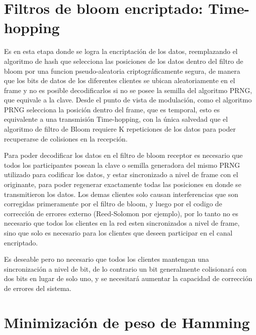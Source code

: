 \section{Filtros de bloom encriptado: Time-hopping}

Es en esta etapa donde se logra la encriptación de los datos, reemplazando el algoritmo de hash que selecciona las posiciones de los datos dentro del filtro de bloom por una funcion pseudo-aleatoria criptográficamente segura, de manera que los bits de datos de los diferentes clientes se ubican aleatoriamente en el frame y no es posible decodificarlos si no se posee la semilla del algoritmo PRNG, que equivale a la clave. Desde el punto de vista de modulación, como el algoritmo PRNG selecciona la posición dentro del frame, que es temporal, esto es equivalente a una transmisión Time-hopping, con la única salvedad que el algoritmo de filtro de Bloom requiere K repeticiones de los datos para poder recuperarse de colisiones en la recepción.

Para poder decodificar los datos en el filtro de bloom receptor es necesario que todos los participantes posean la clave o semilla generadora del mismo PRNG utilizado para codificar los datos, y estar sincronizado a nivel de frame con el originante, para poder regenerar exactamente todas las posiciones en donde se transmitieron los datos. Los demas clientes solo causan interferencias que son corregidas primeramente por el filtro de bloom, y luego por el codigo de corrección de errores externo (Reed-Solomon por ejemplo), por lo tanto no es necesario que todos los clientes en la red esten sincronizados a nivel de frame, sino que solo es necesario para los clientes que deseen participar en el canal encriptado.

Es deseable pero no necesario que todos los clientes mantengan una sincronización a nivel de bit, de lo contrario un bit generalmente colisionará con dos bits en lugar de solo uno, y se necesitará aumentar la capacidad de corrección de errores del sistema.

\section{Minimización de peso de Hamming}

